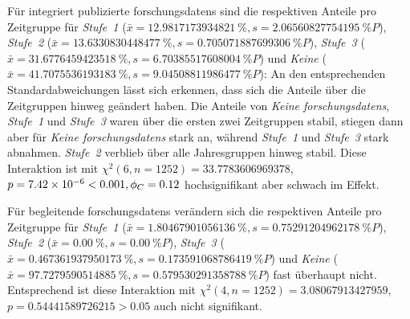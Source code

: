 Für integriert publizierte \glspl{forschungsdaten} sind die respektiven Anteile pro Zeitgruppe für \textit{Stufe~1} ($\bar{x}=\SI[round-mode=places,round-precision=2]{12.9817173934821}{\percent},s=\SI[round-mode=places,round-precision=2]{2.06560827754195}{\percent P}$), \textit{Stufe~2} ($\bar{x}=\SI[round-mode=places,round-precision=2]{13.6330830448477}{\percent},s=\SI[round-mode=places,round-precision=2]{0.705071887699306}{\percent P}$), \textit{Stufe~3} ($\bar{x}=\SI[round-mode=places,round-precision=2]{31.6776459423518}{\percent},s=\SI[round-mode=places,round-precision=2]{6.70385517608004}{\percent P}$) und \textit{Keine} ($\bar{x}=\SI[round-mode=places,round-precision=2]{41.7075536193183}{\percent},s=\SI[round-mode=places,round-precision=2]{9.04508811986477}{\percent P}$):
An den entsprechenden Standardabweichungen lässt sich erkennen, dass sich die Anteile über die Zeitgruppen hinweg geändert haben.
Die Anteile von \textit{Keine \glspl{forschungsdaten}}, \textit{Stufe~1} und \textit{Stufe~3} waren über die ersten zwei Zeitgruppen stabil, stiegen dann aber für \textit{Keine \glspl{forschungsdaten}} stark an, während \textit{Stufe~1} und \textit{Stufe~3} stark abnahmen.
\textit{Stufe~2} verblieb über alle Jahresgruppen hinweg stabil.
Diese Interaktion ist mit $\chi^2 (\num{6}, n=\num{1252}) = \num[round-mode=places,round-precision=2]{33.7783606969378}$, $p = \num[round-mode=places,round-precision=2]{7.42382998991651E-06}<\num{0.001},\phi_C=\num[round-mode=places,round-precision=2]{0.116145428931647}$ hochsignifikant aber schwach im Effekt.

Für begleitende \glspl{forschungsdaten} verändern sich die respektiven Anteile pro Zeitgruppe für \textit{Stufe~1} ($\bar{x}=\SI[round-mode=places,round-precision=2]{1.80467901056136}{\percent},s=\SI[round-mode=places,round-precision=2]{0.75291204962178}{\percent P}$), \textit{Stufe~2} ($\bar{x}=\SI[round-mode=places,round-precision=2]{0,00}{\percent},s=\SI[round-mode=places,round-precision=2]{0.00}{\percent P}$), \textit{Stufe~3} ($\bar{x}=\SI[round-mode=places,round-precision=2]{0.467361937950173}{\percent},s=\SI[round-mode=places,round-precision=2]{0.173591068786419}{\percent P}$) und \textit{Keine} ($\bar{x}=\SI[round-mode=places,round-precision=2]{97.7279590514885}{\percent},s=\SI[round-mode=places,round-precision=2]{0.579530291358788}{\percent P}$) fast überhaupt nicht.
Entsprechend ist diese Interaktion mit $\chi^2 (\num{4}, n=\num{1252}) = \num[round-mode=places,round-precision=2]{3.08067913427959}$, $p = \num[round-mode=places,round-precision=2]{0.54441589726215}>\num{0.05}$ auch nicht signifikant.

